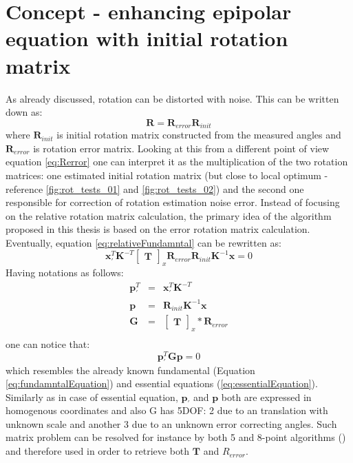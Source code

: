 \section{Concept - enhancing epipolar equation with initial rotation matrix} \label{sec:EpipolarEquation}
As already discussed, rotation can be distorted with noise. This can be written down as:
\begin{equation} \label{eq:Rerror}
\textbf{R} = \textbf{R}_{error}\textbf{R}_{init} 
\end{equation}
where $\textbf{R}_{init}$ is initial rotation matrix constructed from the measured angles and $\textbf{R}_{error}$ is rotation error matrix.
Looking at this from a different point of view equation \ref{eq:Rerror} one can interpret it as the multiplication of the two rotation matrices: 
one estimated initial rotation matrix (but close to local optimum - reference \ref{fig:rot_tests_01} and \ref{fig:rot_tests_02}) and the second one responsible for correction of rotation estimation noise error. 
Instead of focusing on the relative rotation matrix calculation, the primary idea of the algorithm proposed in this thesis is based on the error rotation matrix calculation. Eventually, equation \ref{eq:relativeFundamntal} can be rewritten as:
\begin{equation} \label{eq:relativeFundamntalEnhanced}
\textbf{x}_{'}^{T}\textbf{K}^{-T}\begin{bmatrix}\textbf{T}\end{bmatrix}_{x}\textbf{R}_{error}\textbf{R}_{init}\textbf{K}^{-1}\textbf{x} = 0
\end{equation}
Having notations as follows:
\begin{equation} \label{eq:leftRelative}
\begin{array}{lcl}
\textbf{p}_{'}^{T} &=& \textbf{x}_{'}^{T}\textbf{K}^{-T} \\
\textbf{p} &=& \textbf{R}_{init}\textbf{K}^{-1}\textbf{x} \\
\textbf{G} &=& \begin{bmatrix}\textbf{T}\end{bmatrix}_{x} * \textbf{R}_{error} \\
\end{array}
\end{equation}
one can notice that:
\begin{equation} \label{eq:alternativeEnhancedEquation}
\textbf{p}_{'}^{T}\textbf{G}\textbf{p} = 0
\end{equation}
which resembles the already known fundamental (Equation \ref{eq:fundamntalEquation}) and essential equations (\ref{eq:essentialEquation}). Similarly as in case of essential equation, $\textbf{p}_{'}$ and $\textbf{p}$ both are expressed in homogenous coordinates and also G has 5DOF: 2 due to an translation with unknown scale and another 3 due to an unknown error correcting angles. Such matrix problem can be resolved for instance by both 5 and 8-point algorithms (\cite{8Point}\cite{Batra5point}) and therefore used in order to retrieve both $\textbf{T}$ and $R_{error}$. \\
